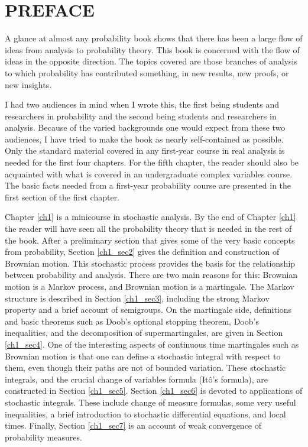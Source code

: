 \chapter*{PREFACE}

A glance at almost any probability book shows that there has been a large flow of ideas from analysis to probability theory. This book is concerned with the flow of ideas in the opposite direction. The topics covered are those branches of analysis to which probability has contributed something, in new results, new proofs, or new insights.

I had two audiences in mind when I wrote this, the first being students and researchers in probability and the second being students and researchers in analysis. Because of the varied backgrounds one would expect from these two audiences, I have tried to make the book as nearly self-contained as possible. Only the standard material covered in any first-year course in real analysis is needed for the first four chapters. For the fifth chapter, the reader should also be acquainted with what is covered in an undergraduate complex variables course. The basic facts needed from a first-year probability course are presented in the first section of the first chapter.

Chapter \ref{ch1} is a minicourse in stochastic analysis. By the end of Chapter \ref{ch1} the reader will have seen all the probability theory that is needed in the rest of the book. After a preliminary section that gives some of the very basic concepts from probability, Section \ref{ch1_sec2} gives the definition and construction of Brownian motion. This stochastic process provides the basis for the relationship between probability and analysis. There are two main reasons for this: Brownian motion is a Markov process, and Brownian motion is a martingale. The Markov structure is described in Section \ref{ch1_sec3}, including the strong Markov property and a brief account of semigroups. On the martingale side, definitions and basic theorems such as Doob's optional stopping theorem, Doob's inequalities, and the decomposition of supermartingales, are given in Section \ref{ch1_sec4}. One of the interesting aspects of continuous time martingales such as Brownian motion is that one can define a stochastic integral with respect to them, even though their paths are not of bounded variation. These stochastic integrals, and the crucial change of variables formula (It\^o's formula), are constructed in Section \ref{ch1_sec5}. Section \ref{ch1_sec6} is devoted to applications of stochastic integrals. These include change of measure formulas, some very useful inequalities, a brief introduction to stochastic differential equations, and local times. Finally, Section \ref{ch1_sec7} is an account of weak convergence of probability measures.

